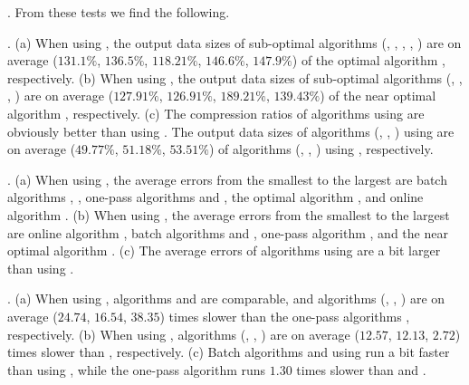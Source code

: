 
.
From these tests we find the following.

\emph{}. 
(a) When using \ped, the output data sizes of sub-optimal algorithms (\tpa,
\dpa, \bqsa, \siped, \operb) are on average ($131.1\%$, $136.5\%$, $118.21\%$, $146.6\%$, $147.9\%$)
of the optimal algorithm \optp, respectively.
(b) When using \sed, the output data sizes of sub-optimal algorithms (\tpa,
\dpa, \squishe, \cised) are on average ($127.91\%$, $126.91\%$, $189.21\%$, $139.43\%$) of the near optimal algorithm \nopts, respectively.
(c) The compression ratios of algorithms using \ped are obviously better than
using \sed. The output data sizes of algorithms (\optp, \tpa, \dpa) using \ped
are on average ($49.77\%$, $51.18\%$, $53.51\%$) of algorithms (\nopts, \tpa, \dpa) using \sed, respectively.

\emph{}. 
(a) When using \ped, the average errors from the smallest to the largest are batch algorithms \tpa, \dpa, one-pass algorithms \siped and \operb, the optimal algorithm \optp, and online algorithm \bqsa. 
(b) When using \sed, the average errors from the smallest to the largest are online algorithm \squishe, batch algorithms \tpa and \dpa, one-pass algorithm \cised, and the near optimal algorithm \nopts.
(c) The average errors of algorithms using \sed are a bit larger than using \ped. 

\emph{}.
(a) When using \ped, algorithms \siped and \operb are comparable, and algorithms (\tpa, \dpa, \bqsa) are on average ($24.74$,
$16.54$, $38.35$) times slower than the one-pass algorithms \siped, respectively. 
(b) When using \sed, algorithms (\tpa, \dpa, \squishe) are on average ($12.57$, $12.13$, $2.72$) times slower than \cised, respectively.
(c) Batch algorithms \dpa and \tpa using \sed run a bit faster than using \ped, while the one-pass algorithm \cised runs {$1.30$} times slower than \siped and \operb.




